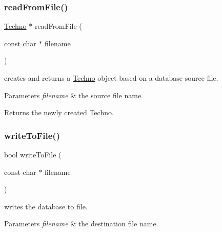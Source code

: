 \subsubsection{\texorpdfstring{read\+From\+File()}{readFromFile()}}
{\footnotesize\ttfamily \hyperlink{class_d_t_r_1_1_techno}{Techno} $\ast$ read\+From\+File (\begin{DoxyParamCaption}\item[{const char $\ast$}]{filename }\end{DoxyParamCaption})\hspace{0.3cm}{\ttfamily [static]}}



creates and returns a \hyperlink{class_d_t_r_1_1_techno}{Techno} object based on a database source file. 


\begin{DoxyParams}{Parameters}
{\em filename} & the source file name.\\
\hline
\end{DoxyParams}
\begin{DoxyReturn}{Returns}
the newly created \hyperlink{class_d_t_r_1_1_techno}{Techno}. 
\end{DoxyReturn}
\mbox{\label{class_d_t_r_1_1_techno_a26b05539dd3345963b8708788b82e2cb}} 
\subsubsection{\texorpdfstring{write\+To\+File()}{writeToFile()}}
{\footnotesize\ttfamily bool write\+To\+File (\begin{DoxyParamCaption}\item[{const char $\ast$}]{filename }\end{DoxyParamCaption})}



writes the database to file. 


\begin{DoxyParams}{Parameters}
{\em filename} & the destination file name. \\
\hline
\end{DoxyParams}
